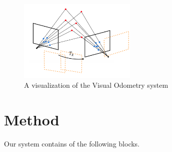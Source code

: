 \documentclass[12pt,twocolumn,letterpaper]{article}
\begin{document}
\begin{figure}
\includegraphics[width=0.5\textwidth]{images/system}
\caption{A visualization of the Visual Odometry system}
\label{fig:system}
\end{figure}

\section{Method}
Our system contains of the following blocks.
\end{document}
